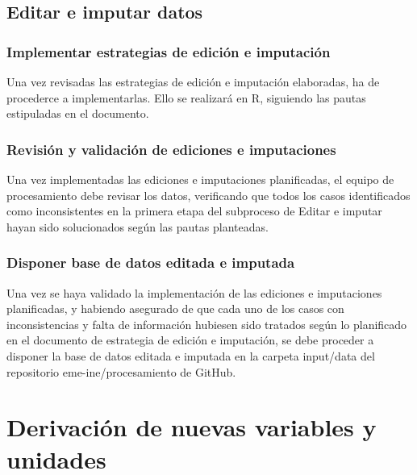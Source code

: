 \documentclass[
]{article}
\begin{document}
\hypertarget{editar-e-imputar-datos}{%
\subsection{Editar e imputar datos}\label{editar-e-imputar-datos}}

\hypertarget{implementar-estrategias-de-ediciuxf3n-e-imputaciuxf3n}{%
\subsubsection{Implementar estrategias de edición e imputación}\label{implementar-estrategias-de-ediciuxf3n-e-imputaciuxf3n}}

Una vez revisadas las estrategias de edición e imputación elaboradas, ha de procederce a implementarlas. Ello se realizará en R, siguiendo las pautas estipuladas en el documento.

\hypertarget{revisiuxf3n-y-validaciuxf3n-de-ediciones-e-imputaciones}{%
\subsubsection{Revisión y validación de ediciones e imputaciones}\label{revisiuxf3n-y-validaciuxf3n-de-ediciones-e-imputaciones}}

Una vez implementadas las ediciones e imputaciones planificadas, el equipo de procesamiento debe revisar los datos, verificando que todos los casos identificados como inconsistentes en la primera etapa del subproceso de Editar e imputar hayan sido solucionados según las pautas planteadas.

\hypertarget{disponer-base-de-datos-editada-e-imputada}{%
\subsubsection{Disponer base de datos editada e imputada}\label{disponer-base-de-datos-editada-e-imputada}}

Una vez se haya validado la implementación de las ediciones e imputaciones planificadas, y habiendo asegurado de que cada uno de los casos con inconsistencias y falta de información hubiesen sido tratados según lo planificado en el documento de estrategia de edición e imputación, se debe proceder a disponer la base de datos editada e imputada en la carpeta input/data del repositorio eme-ine/procesamiento de GitHub.

\newpage

\hypertarget{derivaciuxf3n-de-nuevas-variables-y-unidades}{%
\section{Derivación de nuevas variables y unidades}\label{derivaciuxf3n-de-nuevas-variables-y-unidades}}
\end{document}
